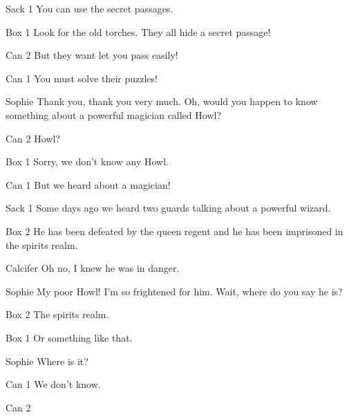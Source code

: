 \begin{screenplay}
\begin{dialogue}{Sack 1}
You can use the secret passages.
\end{dialogue}
\begin{dialogue}{Box 1}
Look for the old torches. They all hide a secret passage!
\end{dialogue}
\begin{dialogue}{Can 2}
But they want let you pass easily!
\end{dialogue}
\begin{dialogue}{Can 1}
You must solve their puzzles!
\end{dialogue}
\begin{dialogue}[grateful]{Sophie}
Thank you, thank you very much. Oh, would you happen to know something about a powerful magician called Howl?
\end{dialogue}
\begin{dialogue}{Can 2}
Howl?
\end{dialogue}
\begin{dialogue}{Box 1}
Sorry, we don’t know any Howl.
\end{dialogue}
\begin{dialogue}{Can 1}
But we heard about a magician!
\end{dialogue}
\begin{dialogue}{Sack 1}
Some days ago we heard two guards talking about a powerful wizard.
\end{dialogue}
\begin{dialogue}{Box 2}
He has been defeated by the queen regent and he has been imprisoned in the spirits realm.
\end{dialogue}
\begin{dialogue}{Calcifer}
Oh no, I knew he was in danger.
\end{dialogue}
\begin{dialogue}{Sophie}
My poor Howl! I’m so frightened for him. Wait, where do you say he is?
\end{dialogue}
\begin{dialogue}{Box 2}
The spirits realm.
\end{dialogue}
\begin{dialogue}{Box 1}
Or something like that.
\end{dialogue}
\begin{dialogue}{Sophie}
Where is it?
\end{dialogue}
\begin{dialogue}{Can 1}
We don’t know.
\end{dialogue}
\begin{dialogue}{Can 2}

\end{dialogue}
\end{screenplay}
